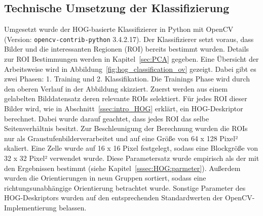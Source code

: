 \subsection{Technische Umsetzung der Klassifizierung} \label{ssec:implementation}
Umgesetzt wurde der HOG-basierte Klassifizierer in Python mit OpenCV (Version: \texttt{opencv-contrib-python} 3.4.2.17). Der Klassifizierer setzt voraus, dass Bilder und die interessanten Regionen (ROI) bereits bestimmt wurden. Details zur ROI Bestimmungen werden in Kapitel~\ref{sec:PCA} gegeben. Eine Übersicht der Arbeitsweise wird in Abbildung~\ref{fig:hog_classification_ov} gezeigt. Dabei gibt es zwei Phasen: 1. Training und 2. Klassifikation. Die Trainings Phase wird durch den oberen Verlauf in der Abbildung skizziert. Zuerst werden aus einem gelabelten Bilddatensatz deren relevante ROIs selektiert. Für jedes ROI dieser Bilder wird, wie in Abschnitt~\ref{ssec:intro_HOG} erklärt, ein HOG-Deskriptor berechnet. Dabei wurde darauf geachtet, dass jedes ROI das selbe Seitenverhältnis besitzt. Zur Beschleunigung der Berechnung wurden die ROIs nur als Graustufenbilderverarbeitet und auf eine Größe von 64 x 128 Pixel² skaliert. Eine Zelle wurde auf 16 x 16 Pixel festgelegt, sodass eine Blockgröße von 32 x 32 Pixel² verwendet wurde. Diese Parametersatz wurde empirisch als der mit den Ergebnissen bestimmt (siehe Kapitel~\ref{sssec:HOG:parmeter}). Außerdem wurden die Orientierungen in neun Gruppen sortiert, sodass eine richtungsunabhängige Orientierung betrachtet wurde. Sonstige Parameter des HOG-Deskriptors wurden auf den entsprechenden Standardwerten der OpenCV-Implementierung belassen.

